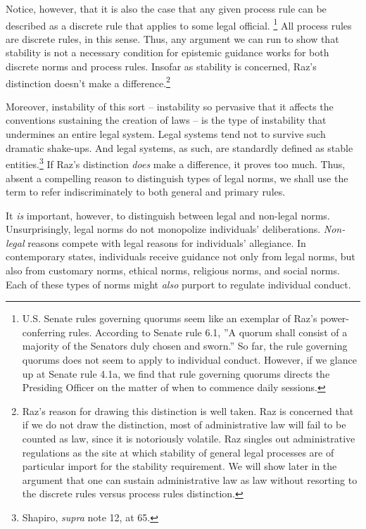 Notice, however, that it is also the case that any given process rule
can be described as a discrete rule that applies to some legal official.
\footnote{U.S. Senate rules governing quorums seem like an exemplar of
  Raz's power-conferring rules. According to Senate rule 6.1, ''A quorum
  shall consist of a majority of the Senators duly chosen and sworn.''
  So far, the rule governing quorums does not seem to apply to
  individual conduct. However, if we glance up at Senate rule 4.1a, we
  find that rule governing quorums directs the Presiding Officer on the
  matter of when to commence daily sessions.} All process rules are
discrete rules, in this sense. Thus, any argument we can run to show
that stability is not a necessary condition for epistemic guidance works
for both discrete norms and process rules. Insofar as stability is
concerned, Raz's distinction doesn't make a difference.\footnote{Raz's
  reason for drawing this distinction is well taken. Raz is concerned
  that if we do not draw the distinction, most of administrative law
  will fail to be counted as law, since it is notoriously volatile. Raz
  singles out administrative regulations as the site at which stability
  of general legal processes are of particular import for the stability
  requirement. We will show later in the argument that one can sustain
  administrative law as law without resorting to the discrete rules
  versus process rules distinction.}

Moreover, instability of this sort -- instability so pervasive that it
affects the conventions sustaining the creation of laws -- is the type
of instability that undermines an entire legal system. Legal systems
tend not to survive such dramatic shake-ups. And legal systems, as such,
are standardly defined as stable entities.\footnote{Shapiro,
  \emph{supra} note 12, at 65.} If Raz's distinction \emph{does} make a
difference, it proves too much. Thus, absent a compelling reason to
distinguish types of legal norms, we shall use the term to refer
indiscriminately to both general and primary rules.

It \emph{is} important, however, to distinguish between legal and
non-legal norms. Unsurprisingly, legal norms do not monopolize
individuals' deliberations. \emph{Non-legal} reasons compete with legal
reasons for individuals' allegiance. In contemporary states, individuals
receive guidance not only from legal norms, but also from customary
norms, ethical norms, religious norms, and social norms. Each of these
types of norms might \emph{also} purport to regulate individual conduct.


